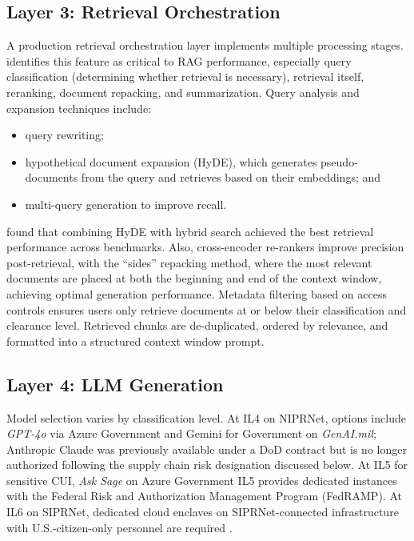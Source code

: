 \documentclass[12pt,letterpaper]{article}
\let\cite\parencite
\begin{document}
\subsection{Layer 3: Retrieval Orchestration}

A production retrieval orchestration layer implements multiple processing stages. \textcite{wang2024rag} identifies this feature as critical to RAG performance, especially query classification (determining whether retrieval is necessary), retrieval itself, reranking, document repacking, and summarization. Query analysis and expansion techniques include:
\begin{itemize}
\item query rewriting;
\item hypothetical document expansion (HyDE), which generates pseudo-documents from the query and retrieves based on their embeddings; and
\item multi-query generation to improve recall.
\end{itemize}

\textcite{wang2024rag} found that combining HyDE with hybrid search achieved the best retrieval performance across benchmarks. Also, cross-encoder re-rankers improve precision post-retrieval, with the ``sides'' repacking method, where the most relevant documents are placed at both the beginning and end of the context window, achieving optimal generation performance. Metadata filtering based on access controls ensures users only retrieve documents at or below their classification and clearance level. Retrieved chunks are de-duplicated, ordered by relevance, and formatted into a structured context window prompt.

\subsection{Layer 4: LLM Generation}

Model selection varies by classification level. At IL4 on NIPRNet, options include \textit{GPT-4o} via Azure Government and Gemini for Government on \textit{GenAI.mil}; Anthropic Claude was previously available under a DoD contract but is no longer authorized following the supply chain risk designation discussed below. At IL5 for sensitive CUI, \textit{Ask Sage} on Azure Government IL5 provides dedicated instances with the Federal Risk and Authorization Management Program (FedRAMP). At IL6 on SIPRNet, dedicated cloud enclaves on SIPRNet-connected infrastructure with U.S.-citizen-only personnel are required \cite{asksage2025,grsee2025}.
\end{document}
